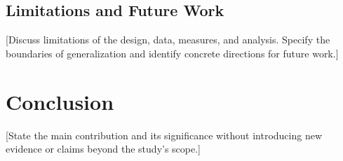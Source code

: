 \documentclass[12pt,letterpaper,oneside]{article}
\begin{document}
\subsection{Limitations and Future Work}
[Discuss limitations of the design, data, measures, and analysis. Specify the
boundaries of generalization and identify concrete directions for future work.]

\section{Conclusion}
[State the main contribution and its significance without introducing new
evidence or claims beyond the study's scope.]

\clearpage


\end{document}
